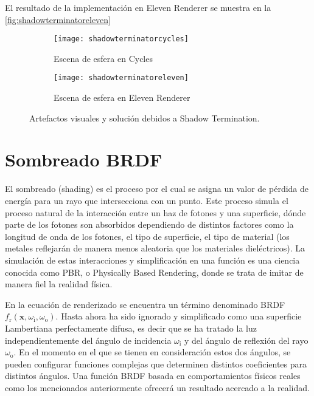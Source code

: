 El resultado de la implementación en Eleven Renderer se muestra en la \autoref{fig:shadowterminatoreleven}

\begin{figure}[H]
	\centering
	  \begin{subfigure}[b]{0.4\textwidth}
		\texttt{[image: shadowterminatorcycles]}
		\caption{Escena de esfera en Cycles}
		\label{fig:shadowterminatorcycles}
	  \end{subfigure}
	 \hfill
	  \begin{subfigure}[b]{0.4\textwidth}
		\texttt{[image: shadowterminatoreleven]}
		\caption{Escena de esfera en Eleven Renderer}
		\label{fig:shadowterminatoreleven}
	  \end{subfigure}
	  \caption{Artefactos visuales y solución debidos a Shadow Termination.}
      \label{fig:shadowterminator}
	 \hfill
\end{figure}
	
\section{Sombreado BRDF}
	
El sombreado (shading) es el proceso por el cual se asigna un valor de pérdida de energía para un rayo que intersecciona con un punto. Este proceso simula el proceso natural de la interacción entre un haz de fotones y una superficie, dónde parte de los fotones son absorbidos dependiendo de distintos factores como la longitud de onda de los fotones, el tipo de superficie, el tipo de material (los metales reflejarán de manera menos aleatoria que los materiales dieléctricos). La simulación de estas interacciones y simplificación en una función es una ciencia conocida como PBR, o Physically Based Rendering, donde se trata de imitar de manera fiel la realidad física. 
		
En la ecuación de renderizado se encuentra un término denominado BRDF $f_{\text{r}}(\mathbf {x} ,\omega _{\text{i}},\omega _{\text{o}})$. Hasta ahora ha sido ignorado y simplificado como una superficie Lambertiana perfectamente difusa, es decir que se ha tratado la luz independientemente del ángulo de incidencia $\omega _{\text{i}}$ y del ángulo de reflexión del rayo $\omega _{\text{o}}$. En el momento en el que se tienen en consideración estos dos ángulos, se pueden configurar funciones complejas que determinen distintos coeficientes para distintos ángulos. Una función BRDF basada en comportamientos físicos reales como los mencionados anteriormente ofrecerá un resultado acercado a la realidad. 
	
